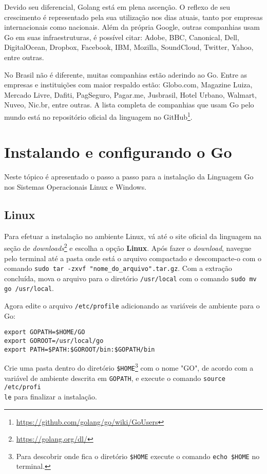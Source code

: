\documentclass{SBCbookchapter}
\begin{document}
Devido seu diferencial, Golang está em plena ascenção. O reflexo de seu crescimento é representado pela sua utilização nos dias atuais, tanto por empresas internacionais como nacionais. Além da própria Google, outras companhias usam Go em suas infraestruturas, é possível citar: Adobe, BBC, Canonical, Dell, DigitalOcean, Dropbox, Facebook, IBM, Mozilla, SoundCloud, Twitter, Yahoo, entre outras.

No Brasil não é diferente, muitas companhias estão aderindo ao Go. Entre as empresas e instituições com maior respaldo estão: Globo.com, Magazine Luiza, Mercado Livre, Dafiti, PagSeguro, Pagar.me, Jusbrasil, Hotel Urbano, Walmart, Nuveo, Nic.br, entre outras. A lista completa de companhias que usam Go pelo mundo está no repositório oficial da linguagem no GitHub\footnote{\url{https://github.com/golang/go/wiki/GoUsers}}.

\section{Instalando e configurando o Go}

Neste tópico é apresentado o passo a passo para a instalação da Linguagem Go nos Sistemas Operacionais Linux e Windows.

\subsection{Linux}

Para efetuar a instalação no ambiente Linux, vá até o site oficial da linguagem na seção de \textit{downloads}\footnote{\label{note1}\url{https://golang.org/dl/}} e escolha a opção \textbf{Linux}. Após fazer o \textit{download}, navegue pelo terminal até a pasta onde está o arquivo compactado e descompacte-o com o comando \texttt{sudo tar -zxvf "nome\_do\_arquivo".tar.gz}. Com a extração concluída, mova o arquivo para o diretório \texttt{/usr/local} com o comando \texttt{sudo mv go /usr/local}.

Agora edite o arquivo \texttt{/etc/profile} adicionando as variáveis de ambiente para o Go:

\noindent\texttt{export GOPATH=\$HOME/GO}\\
\texttt{export GOROOT=/usr/local/go}\\
\texttt{export PATH=\$PATH:\$GOROOT/bin:\$GOPATH/bin}

Crie uma pasta dentro do diretório \texttt{\$HOME}\footnote{Para descobrir onde fica o diretório \texttt{\$HOME} execute o comando \texttt{echo \$HOME} no terminal.} com o nome "GO", de acordo com a variável de ambiente descrita em \texttt{GOPATH}, e execute o comando \texttt{source /etc/profi\\le} para finalizar a instalação.
\end{document}
